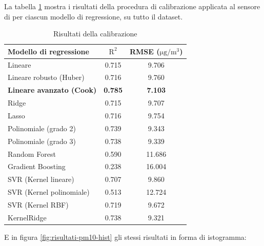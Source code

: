 La tabella \ref{fig:risultati-pm10} mostra i risultati della procedura di calibrazione applicata al sensore di  per ciascun modello di regressione, su tutto il dataset.

\begin{table}[H]
    \footnotesize
    \centering
    \begin{tabular}{|l|c|c|}
    \hline
        \textbf{Modello di regressione} & $\bm{\mathrm{R^2}}$ & \textbf{RMSE (}$\mathrm{\si{\micro}g/m^3}$) \\ \hline
        Lineare & 0.715 & 9.706 \\ \hline
        Lineare robusto (Huber) & 0.716 & 9.760 \\ \hline
        \textbf{Lineare avanzato (Cook)} & \textbf{0.785} & \textbf{7.103} \\ \hline
        Ridge & 0.715 & 9.707 \\ \hline
        Lasso & 0.716 & 9.754 \\ \hline
        Polinomiale (grado 2) & 0.739 & 9.343 \\ \hline
        Polinomiale (grado 3) & 0.738 & 9.339 \\ \hline
        Random Forest & 0.590 & 11.686 \\ \hline
        Gradient Boosting & 0.238 & 16.004 \\ \hline
        SVR (Kernel lineare) & 0.707 & 9.860 \\ \hline
        SVR (Kernel polinomiale) & 0.513 & 12.724 \\ \hline
        SVR (Kernel RBF) & 0.719 & 9.672 \\ \hline
        KernelRidge & 0.738 & 9.321 \\ \hline
    \end{tabular}
    \caption{Risultati della calibrazione }
    \label{fig:risultati-pm10}
\end{table}

E in figura \ref{fig:risultati-pm10-hist} gli stessi risultati in forma di istogramma:

